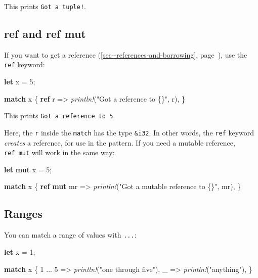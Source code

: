 \documentclass[a4paper,]{book}
\renewcommand*{\hyperlink}[2]{%
 #2 (\autoref{#1}, page~\pageref{#1})}
\newenvironment{Shaded}{\begin{snugshade}}{\end{snugshade}}
\newcommand{\KeywordTok}[1]{\textcolor[rgb]{0.13,0.29,0.53}{\textbf{{#1}}}}
\newcommand{\DecValTok}[1]{\textcolor[rgb]{0.00,0.00,0.81}{{#1}}}
\newcommand{\StringTok}[1]{\textcolor[rgb]{0.31,0.60,0.02}{{#1}}}
\newcommand{\PreprocessorTok}[1]{\textcolor[rgb]{0.56,0.35,0.01}{\textit{{#1}}}}
\newcommand{\NormalTok}[1]{{#1}}
\begin{document}
This prints \texttt{Got\ a\ tuple!}.

\subsection{ref and ref mut}\label{ref-and-ref-mut}

If you want to get a
\protect\hyperlink{sec--references-and-borrowing}{reference}, use the
\texttt{ref} keyword:

\begin{Shaded}
\begin{Highlighting}[]
\KeywordTok{let} \NormalTok{x = }\DecValTok{5}\NormalTok{;}

\KeywordTok{match} \NormalTok{x \{}
    \KeywordTok{ref} \NormalTok{r => }\PreprocessorTok{println!}\NormalTok{(}\StringTok{"Got a reference to \{\}"}\NormalTok{, r),}
\NormalTok{\}}
\end{Highlighting}
\end{Shaded}

This prints \texttt{Got\ a\ reference\ to\ 5}.

Here, the \texttt{r} inside the \texttt{match} has the type
\texttt{\&i32}. In other words, the \texttt{ref} keyword \emph{creates}
a reference, for use in the pattern. If you need a mutable reference,
\texttt{ref\ mut} will work in the same way:

\begin{Shaded}
\begin{Highlighting}[]
\KeywordTok{let} \KeywordTok{mut} \NormalTok{x = }\DecValTok{5}\NormalTok{;}

\KeywordTok{match} \NormalTok{x \{}
    \KeywordTok{ref} \KeywordTok{mut} \NormalTok{mr => }\PreprocessorTok{println!}\NormalTok{(}\StringTok{"Got a mutable reference to \{\}"}\NormalTok{, mr),}
\NormalTok{\}}
\end{Highlighting}
\end{Shaded}

\subsection{Ranges}\label{ranges}

You can match a range of values with \texttt{...}:

\begin{Shaded}
\begin{Highlighting}[]
\KeywordTok{let} \NormalTok{x = }\DecValTok{1}\NormalTok{;}

\KeywordTok{match} \NormalTok{x \{}
    \DecValTok{1} \NormalTok{... }\DecValTok{5} \NormalTok{=> }\PreprocessorTok{println!}\NormalTok{(}\StringTok{"one through five"}\NormalTok{),}
    \NormalTok{_ => }\PreprocessorTok{println!}\NormalTok{(}\StringTok{"anything"}\NormalTok{),}
\NormalTok{\}}
\end{Highlighting}
\end{Shaded}
\end{document}
